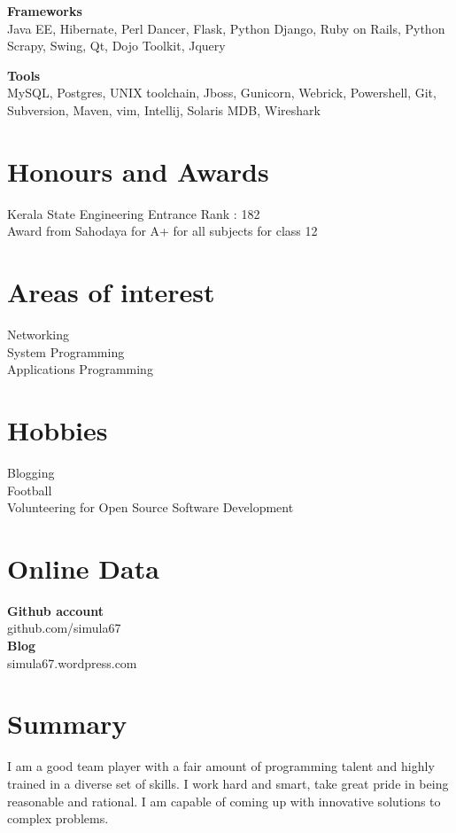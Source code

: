 \documentclass[line,margin]{res}
\begin{document}
\begin{resume}
{\bf Frameworks}\\
Java EE, Hibernate, Perl Dancer, Flask, Python Django, Ruby on Rails, Python Scrapy, Swing, Qt, Dojo Toolkit, Jquery 

{\bf Tools}\\
MySQL, Postgres, UNIX toolchain, Jboss, Gunicorn, Webrick, Powershell, Git, Subversion, Maven, vim, Intellij, Solaris MDB, Wireshark

\section{Honours and Awards}
Kerala State Engineering Entrance Rank : 182\\
Award from Sahodaya for A+ for all subjects for class 12\\

\section{Areas of interest}
Networking\\
System Programming\\
Applications Programming\\

\section{Hobbies}
Blogging\\
Football\\
Volunteering for Open Source Software Development\\

\section{Online Data}
{\bf Github account}\\
github.com/simula67\\
{\bf Blog}\\
simula67.wordpress.com

\section{Summary}
I am a good team player with a fair amount of programming talent and highly trained in a diverse set of skills. I work hard and smart, take great pride in being reasonable and rational. I am capable of coming up with innovative solutions to complex problems.

\end{resume}
\end{document}
